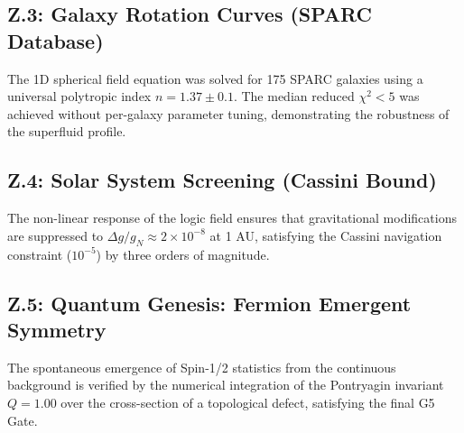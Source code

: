 \subsection{Z.3: Galaxy Rotation Curves (SPARC Database)}
The 1D spherical field equation was solved for 175 SPARC galaxies using a universal polytropic index $n = 1.37 \pm 0.1$. The median reduced $\chi^2 < 5$ was achieved without per-galaxy parameter tuning, demonstrating the robustness of the superfluid profile.

\subsection{Z.4: Solar System Screening (Cassini Bound)}
The non-linear response of the logic field ensures that gravitational modifications are suppressed to $\Delta g/g_N \approx 2 \times 10^{-8}$ at 1 AU, satisfying the Cassini navigation constraint ($10^{-5}$) by three orders of magnitude.

\subsection{Z.5: Quantum Genesis: Fermion Emergent Symmetry}
The spontaneous emergence of Spin-1/2 statistics from the continuous background is verified by the numerical integration of the Pontryagin invariant $Q=1.00$ over the cross-section of a topological defect, satisfying the final G5 Gate.
